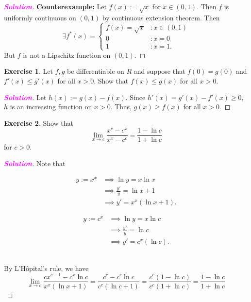 \documentclass[12pt,openany]{book}
\theoremstyle{definition}
\newtheorem{exercise}{Exercise}[chapter]
\newcommand{\sol}{\textcolor{magenta}{\bf Solution}}
\begin{document}
	\begin{proof}[\sol]
		\textbf{Counterexample:} Let $f(x):=\sqrt{x}$ for $x\in(0,1)$. Then $f$ is uniformly continuous on $(0,1)$ by continuous extension theorem. Then \[
		\exists f^*(x)=\begin{cases}
			f(x)=\sqrt{x} &:x\in(0,1)\\
			0&:x=0\\
			1&:x=1.
		\end{cases}
		\] But $f$ is not a Lipschitz function on $(0,1)$.
	\end{proof}
	\vspace{20pt}
	\newpage
	\begin{tcolorbox}[colframe=execolor, title={\color{white}\bf}]
	\begin{exercise}
		Let $f,g$ be differentiable on $R$ and suppose that $f(0)=g(0)$ and $f'(x)\leq g'(x)$ for all $x>0$. Show that $f(x)\leq g(x)$ for all $x>0$.
	\end{exercise}
	\end{tcolorbox}
	\begin{proof}[\sol]
		Let $h(x):=g(x)-f(x)$. Since $h'(x)=g'(x)-f'(x)\geq 0$, $h$ is an increasing function on $x> 0$. Thus, $g(x)\geq f(x)$ for all $x>0$.
	\end{proof}
	\vspace{20pt}
	\begin{tcolorbox}[colframe=execolor, title={\color{white}\bf}]
	\begin{exercise}
		Show that \[
		\lim\limits_{x\to c}\frac{x^c-c^x}{x^x-c^c}=\frac{1-\ln c}{1+\ln c}
		\] for $c>0$.
	\end{exercise}
	\end{tcolorbox}
	\begin{proof}[\sol]
		Note that \begin{figure}[h!]\centering
			\begin{minipage}{.4\textwidth}
				\begin{align*}
					y:=x^x&\implies\ln y = x\ln x \\
					&\implies\frac{y'}{y}=\ln x + 1\\
					&\implies y'=x^x(\ln x+1). 
				\end{align*}
			\end{minipage}
			\begin{minipage}{.4\textwidth}
				\begin{align*}
					y:=c^x&\implies\ln y = x\ln c \\
					&\implies\frac{y'}{y}=\ln c\\
					&\implies y'=c^x(\ln c). 
				\end{align*}
			\end{minipage}
		\end{figure}\\
		By L'H\^{o}pital's rule, we have \[
		\lim\limits_{x\to c}\frac{cx^{c-1}-c^x\ln c}{x^x(\ln x+1)}=\frac{c^c-c^c\ln c}{c^c(\ln c+1)}=\frac{c^c(1-\ln c)}{c^c(1+\ln c)}=\frac{1-\ln c}{1+\ln c}
		\]
	\end{proof}
\end{document}
